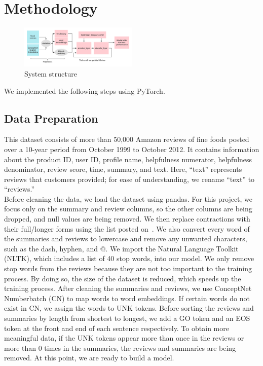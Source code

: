 \documentclass[conference]{IEEEtran}
\begin{document}
\section{Methodology}
\begin{figure}[h]
\centering
\includegraphics[width=0.5\textwidth]{imgs/System_Structure.png}
\caption{System structure}
\label{fig:System_Structure}
\end{figure}
\begin{flushleft} 
We implemented the following steps using PyTorch.
\end{flushleft}
\subsection{Data Preparation}
This dataset consists of more than 50,000 Amazon reviews of fine foods posted over a 10-year period from October 1999 to October 2012. It contains information about the product ID, user ID, profile name, helpfulness numerator, helpfulness denominator, review score, time, summary, and text. Here, “text” represents reviews that customers provided; for ease of understanding, we rename “text” to “reviews.” \\
\indent Before cleaning the data, we load the dataset using pandas. For this project, we focus only on the summary and review columns, so the other columns are being dropped, and null values are being removed. We then replace contractions with their full/longer forms using the list posted on~\cite{unknown1}. We also convert every word of the summaries and reviews to lowercase and remove any unwanted characters, such as the dash, hyphen, and @. We import the Natural Language Toolkit (NLTK), which includes a list of 40 stop words, into our model. We only remove stop words from the reviews because they are not too important to the training process. By doing so, the size of the dataset is reduced, which speeds up the training process. After cleaning the summaries and reviews, we use ConceptNet Numberbatch (CN) to map words to word embeddings. If certain words do not exist in CN, we assign the words to UNK tokens. Before sorting the reviews and summaries by length from shortest to longest, we add a GO token and an EOS token at the front and end of each sentence respectively. To obtain more meaningful data, if the UNK tokens appear more than once in the reviews or more than 0 times in the summaries, the reviews and summaries are being removed. At this point, we are ready to build a model.
\end{document}
